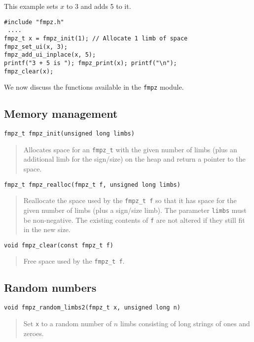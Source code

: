 \documentclass[a4paper,10pt]{article}
\newcommand{\code}{\lstinline}
\begin{document}
This example sets $x$ to 3 and adds 5 to it.

\begin{lstlisting}
#include "fmpz.h"
 ....
fmpz_t x = fmpz_init(1); // Allocate 1 limb of space
fmpz_set_ui(x, 3);
fmpz_add_ui_inplace(x, 5);
printf("3 + 5 is "); fmpz_print(x); printf("\n");
fmpz_clear(x);
\end{lstlisting}

We now discuss the functions available in the \code{fmpz} module.

\subsection{Memory management}

\begin{lstlisting}
fmpz_t fmpz_init(unsigned long limbs) 
\end{lstlisting}
\begin{quote}
Allocates space for an \code{fmpz_t} with the given number of limbs (plus an additional limb for the sign/size) on the heap and return a pointer to the space.
\end{quote}

\begin{lstlisting}
fmpz_t fmpz_realloc(fmpz_t f, unsigned long limbs)
\end{lstlisting}
\begin{quote}
Reallocate the space used by the \code{fmpz_t f} so that it has space for the given number of limbs (plus a sign/size limb). The parameter \code{limbs} must be non-negative. The existing contents of \code{f} are not altered if they still fit in the new size.
\end{quote}

\begin{lstlisting}
void fmpz_clear(const fmpz_t f)
\end{lstlisting}
\begin{quote}
Free space used by the \code{fmpz_t f}.
\end{quote}

\subsection{Random numbers}

\begin{lstlisting}
void fmpz_random_limbs2(fmpz_t x, unsigned long n)
\end{lstlisting}
\begin{quote}
Set \code{x} to a random number of $n$ limbs consisting of long strings of ones and zeroes.
\end{quote}
\end{document}
